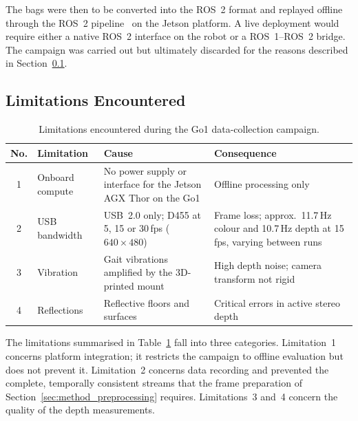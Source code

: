 {\small The bags were then to be converted into the ROS~2 format and replayed offline through the ROS~2 pipeline~\cite{macenski2022ros2} on the Jetson platform. A live deployment would require either a native ROS~2 interface on the robot or a ROS~1--ROS~2 bridge. The campaign was carried out but ultimately discarded for the reasons described in Section~\ref{subsec:impl_go1_limitations}.\par}

\subsection{Limitations Encountered}
\label{subsec:impl_go1_limitations}

{\small
\begin{table}[htbp]
\centering
\footnotesize
\setlength{\tabcolsep}{4pt}
\caption{Limitations encountered during the Go1 data-collection campaign.}
\label{tab:go1_limitations}
\begin{tabular}{@{}c p{}p{}p{}@{}}
\toprule
\textbf{No.} & \textbf{Limitation} & \textbf{Cause} & \textbf{Consequence} \\
\midrule
1 & \raggedright Onboard compute & \raggedright No power supply or interface for the Jetson AGX Thor on the Go1 & \raggedright Offline processing only \tabularnewline
2 & \raggedright USB bandwidth & \raggedright USB~2.0 only; D455 at 5, 15 or 30\,fps ($640 \times 480$) & \raggedright Frame loss; approx.\ 11.7\,Hz colour and 10.7\,Hz depth at 15\,fps, varying between runs \tabularnewline
3 & \raggedright Vibration & \raggedright Gait vibrations amplified by the 3D-printed mount & \raggedright High depth noise; camera transform not rigid \tabularnewline
4 & \raggedright Reflections & \raggedright Reflective floors and surfaces & \raggedright Critical errors in active stereo depth \tabularnewline
\bottomrule
\end{tabular}
\end{table}
\par}

{\small The limitations summarised in Table~\ref{tab:go1_limitations} fall into three categories. Limitation~1 concerns platform integration; it restricts the campaign to offline evaluation but does not prevent it. Limitation~2 concerns data recording and prevented the complete, temporally consistent streams that the frame preparation of Section~\ref{sec:method_preprocessing} requires. Limitations~3 and~4 concern the quality of the depth measurements.\par}

